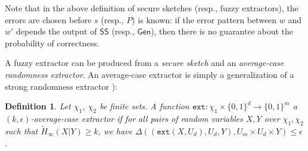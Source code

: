 \documentclass[11pt]{article}
\newcommand{\secref}[1]{\mbox{Section~\ref{#1}}}
\newcommand{\defref}[1]{\mbox{Definition~\ref{#1}}}
\newcommand{\class}[1]{{\ensuremath{\mathsf{#1}}}}
\newcommand{\gen}{\ensuremath{\class{Gen}}\xspace}
\newcommand{\sketch}{\ensuremath{\class{SS}}\xspace}
\newcommand{\rec}{\ensuremath{\class{Rec}}\xspace}
\newcommand{\dis}{\ensuremath{\mathsf{dis}}}
\newcommand{\ext}{\ensuremath{\mathtt{ext}}}
\newtheorem{definition}[theorem]{Definition}
\newcommand{\authnote}[2]{{\textcolor{red}{\textsf{#1 notes: }\textcolor{blue}{ #2}}\marginpar{\textcolor{red}{\textbf{!!!!!}}}}}
\newcommand{\authnote}[2]{}
\newcommand{\lnote}[1]{{\authnote{Leo}{#1}}}
\begin{document}
Note that in the above definition of secure sketches (resp., fuzzy extractors), the errors are chosen before $s$ (resp., $P$) is known: if the error pattern between $w$ and $w'$ depends the output of $\sketch$ (resp., $\gen$), then there is no guarantee about the probability of correctness.


A fuzzy extractor can be produced from a \emph{secure sketch} and an \emph{average-case randomness extractor}. An average-case extractor is simply a generalization of a strong randomness extractor \cite[Definition 2]{nisan1993randomness}):

\begin{definition}
Let $\chi_1$, $\chi_2$ be finite sets.
A function $\ext: \chi_1\times \{0,1\}^d \rightarrow \{0,1\}^m$ a \emph{$(k, \epsilon)$-average-case extractor} if for all pairs
of random variables $X, Y$ over $\chi_1, \chi_2$ such that
$\tilde{H}_\infty(X|Y) \ge k$, we have $\Delta((\ext(X, U_d), U_d, Y), U_m\times
U_d \times Y) \le \epsilon$.
\end{definition}


\end{document}
